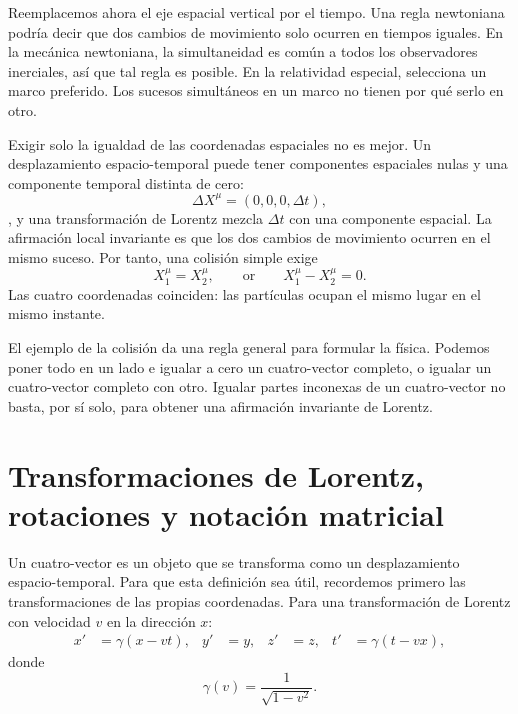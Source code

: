 Reemplacemos ahora el eje espacial vertical por el tiempo. Una regla newtoniana podría decir que dos cambios de movimiento solo ocurren en tiempos iguales. En la mecánica newtoniana, la simultaneidad es común a todos los observadores inerciales, así que tal regla es posible. En la relatividad especial, selecciona un marco preferido. Los sucesos simultáneos en un marco no tienen por qué serlo en otro.

Exigir solo la igualdad de las coordenadas espaciales no es mejor. Un desplazamiento espacio-temporal puede tener componentes espaciales nulas y una componente temporal distinta de cero: \begin{equation}
  \Delta X^\mu=(0,0,0,\Delta t),
\end{equation}, y una transformación de Lorentz mezcla \(\Delta t\) con una componente espacial. La afirmación local invariante es que los dos cambios de movimiento ocurren en el mismo suceso. Por tanto, una colisión simple exige \begin{equation}
  X_1^\mu=X_2^\mu,
  \qquad\text{or}\qquad
  X_1^\mu-X_2^\mu=0.
\end{equation} Las cuatro coordenadas coinciden: las partículas ocupan el mismo lugar en el mismo instante.

El ejemplo de la colisión da una regla general para formular la física. Podemos poner todo en un lado e igualar a cero un cuatro-vector completo, o igualar un cuatro-vector completo con otro. Igualar partes inconexas de un cuatro-vector no basta, por sí solo, para obtener una afirmación invariante de Lorentz.

\section{Transformaciones de Lorentz, rotaciones y notación matricial}

Un cuatro-vector es un objeto que se transforma como un desplazamiento espacio-temporal. Para que esta definición sea útil, recordemos primero las transformaciones de las propias coordenadas. Para una transformación de Lorentz con velocidad \(v\) en la dirección \(x\): \begin{align}
  x'&=\gamma(x-vt), & y'&=y, & z'&=z,
  & t'&=\gamma(t-vx),                                      \label{eq:l6-boost}
\end{align} donde \begin{equation}
  \gamma(v)=\frac{1}{\sqrt{1-v^2}}.
\end{equation}

